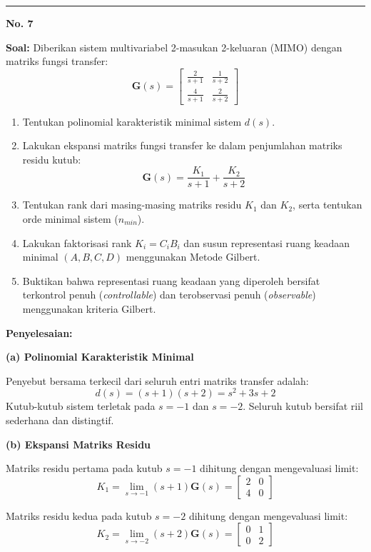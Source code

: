 \documentclass[11pt,a4paper]{article}
\begin{document}
\vspace{12pt}
\hrule
\vspace{10pt}

\textbf{\large No. 7}

\textbf{Soal:}  
Diberikan sistem multivariabel 2-masukan 2-keluaran (MIMO) dengan matriks fungsi transfer:
$$\mathbf{G}(s) = \begin{bmatrix} \frac{2}{s+1} & \frac{1}{s+2} \\ \frac{4}{s+1} & \frac{2}{s+2} \end{bmatrix}$$
\begin{enumerate}[label=(\alph*)]
    \item Tentukan polinomial karakteristik minimal sistem $d(s)$.
    \item Lakukan ekspansi matriks fungsi transfer ke dalam penjumlahan matriks residu kutub:
    $$\mathbf{G}(s) = \frac{K_1}{s+1} + \frac{K_2}{s+2}$$
    \item Tentukan rank dari masing-masing matriks residu $K_1$ dan $K_2$, serta tentukan orde minimal sistem ($n_{min}$).
    \item Lakukan faktorisasi rank $K_i = C_i B_i$ dan susun representasi ruang keadaan minimal $(A, B, C, D)$ menggunakan Metode Gilbert.
    \item Buktikan bahwa representasi ruang keadaan yang diperoleh bersifat terkontrol penuh (\textit{controllable}) dan terobservasi penuh (\textit{observable}) menggunakan kriteria Gilbert.
\end{enumerate}

\textbf{Penyelesaian:}

\textbf{(a) Polinomial Karakteristik Minimal}

Penyebut bersama terkecil dari seluruh entri matriks transfer adalah:
$$d(s) = (s+1)(s+2) = s^2 + 3s + 2$$
Kutub-kutub sistem terletak pada $s = -1$ dan $s = -2$. Seluruh kutub bersifat riil sederhana dan distingtif.

\textbf{(b) Ekspansi Matriks Residu}

Matriks residu pertama pada kutub $s = -1$ dihitung dengan mengevaluasi limit:
$$K_1 = \lim_{s \to -1} (s+1) \mathbf{G}(s) = \begin{bmatrix} 2 & 0 \\ 4 & 0 \end{bmatrix}$$

Matriks residu kedua pada kutub $s = -2$ dihitung dengan mengevaluasi limit:
$$K_2 = \lim_{s \to -2} (s+2) \mathbf{G}(s) = \begin{bmatrix} 0 & 1 \\ 0 & 2 \end{bmatrix}$$
\end{document}
